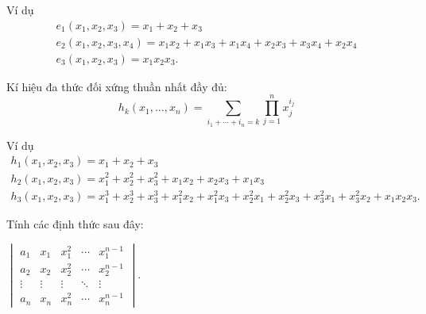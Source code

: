 Ví dụ
\begin{gather*}
    e_{1}(x_{1}, x_{2}, x_{3}) = x_{1} + x_{2} + x_{3} \\
    e_{2}(x_{1}, x_{2}, x_{3}, x_{4}) = x_{1}x_{2} + x_{1}x_{3} + x_{1}x_{4} + x_{2}x_{3} + x_{3}x_{4} + x_{2}x_{4} \\
    e_{3}(x_{1}, x_{2}, x_{3}) = x_{1}x_{2}x_{3}.
\end{gather*}

Kí hiệu đa thức đối xứng thuần nhất đầy đủ:
\[
    h_{k}(x_{1}, \ldots, x_{n}) = \sum_{i_{1}+\cdots+i_{n}=k}\prod^{n}_{j=1}x^{i_{j}}_{j}
\]

Ví dụ
\begin{gather*}
    h_{1}(x_{1}, x_{2}, x_{3}) = x_{1} + x_{2} + x_{3} \\
    h_{2}(x_{1}, x_{2}, x_{3}) = x_{1}^{2} + x_{2}^{2} + x_{3}^{2} + x_{1}x_{2} + x_{2}x_{3} + x_{1}x_{3} \\
    h_{3}(x_{1}, x_{2}, x_{3}) = x_{1}^{3} + x_{2}^{3} + x_{3}^{3} + x_{1}^{2}x_{2} + x_{1}^{2}x_{3} + x_{2}^{2}x_{1} + x_{2}^{2}x_{3} + x_{3}^{2}x_{1} + x_{3}^{2}x_{2} + x_{1}x_{2}x_{3}.
\end{gather*}

Tính các định thức sau đây:

\begin{exercise}
    $\begin{vmatrix}
            a_{1}  & x_{1}  & x_{1}^{2} & \cdots & x_{1}^{n-1} \\
            a_{2}  & x_{2}  & x_{2}^{2} & \cdots & x_{2}^{n-1} \\
            \vdots & \vdots & \vdots    & \ddots & \vdots      \\
            a_{n}  & x_{n}  & x_{n}^{2} & \cdots & x_{n}^{n-1}
        \end{vmatrix}$.
\end{exercise}

